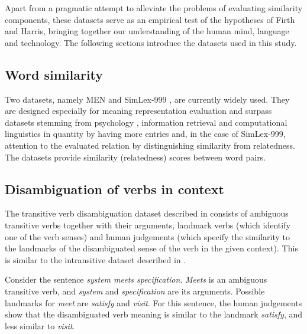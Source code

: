 Apart from a pragmatic attempt to alleviate the problems of evaluating
similarity components, these datasets serve as an empirical test of the
hypotheses of Firth and Harris, bringing together our understanding of the human mind, language and technology. The following sections introduce the datasets used in this study.

\subsection{Word similarity}
\label{sec:lexical-similarity}

Two datasets, namely MEN \cite{Bruni:2012:DST:2390524.2390544} and SimLex-999 \cite{hill2014simlex}, are currently widely used. They are designed especially for meaning representation evaluation and surpass datasets stemming from psychology \cite{1986-13502-00119860101}, information retrieval \cite{2002:PSC:503104.503110} and computational linguistics \cite{Rubenstein:1965:CCS:365628.365657} in quantity by having more entries and, in the case of SimLex-999, attention to the evaluated relation by distinguishing similarity from relatedness. The datasets provide similarity (relatedness) scores between word pairs.
%
%
%

\subsection{Disambiguation of verbs in context}
\label{sec:disamb}

The transitive verb disambiguation dataset
described in  consists of ambiguous transitive verbs together with their arguments, landmark verbs (which identify one of the verb senses) and human judgements (which specify the similarity to the landmarks of the disambiguated sense of the verb in the given context). This is similar to the intransitive dataset described in .

Consider the sentence \textit{system meets specification}. \textit{Meets} is an ambiguous transitive verb, and \textit{system}
and \textit{specification} are its arguments. Possible landmarks for \emph{meet} are \textit{satisfy} and \textit{visit}. For this sentence, the human judgements show that the disambiguated verb meaning is similar to the landmark \textit{satisfy}, and less similar to \textit{visit}.

